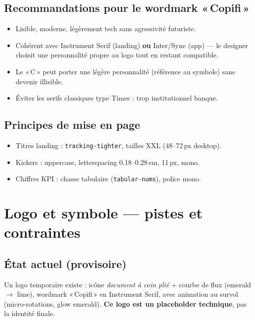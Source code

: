 \documentclass[11pt,a4paper]{report}
\begin{document}
\section{Recommandations pour le wordmark «\,Copifi\,»}

\begin{itemize}[leftmargin=*]
    \item Lisible, moderne, légèrement tech sans agressivité futuriste.
    \item Cohérent avec Instrument Serif (landing) \textbf{ou} Inter/Syne (app) — le designer choisit
    une personnalité propre au logo tout en restant compatible.
    \item Le «\,C\,» peut porter une légère personnalité (référence au symbole) sans devenir illisible.
    \item Éviter les serifs classiques type Times : trop institutionnel banque.
\end{itemize}

\section{Principes de mise en page}

\begin{itemize}[leftmargin=*]
    \item Titres landing : \texttt{tracking-tighter}, tailles XXL (48--72\,px desktop).
    \item Kickers : uppercase, letterspacing 0.18--0.28\,em, 11\,px, mono.
    \item Chiffres KPI : chasse tabulaire (\texttt{tabular-nums}), police mono.
\end{itemize}

\chapter{Logo et symbole — pistes et contraintes}

\section{État actuel (provisoire)}

Un logo temporaire existe : icône \emph{document à coin plié} + courbe de flux (emerald $\rightarrow$ lime),
wordmark «\,Copifi\,» en Instrument Serif, avec animation au survol (micro-rotations, glow emerald).
\textbf{Ce logo est un placeholder technique}, pas la identité finale.
\end{document}
